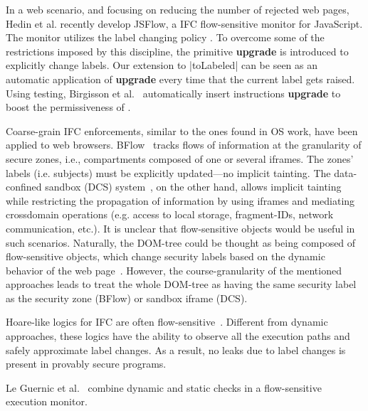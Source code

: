 In a web scenario, and focusing on reducing the number of rejected web pages,
Hedin et al. \citep{Hedin13} recently develop JSFlow, a IFC flow-sensitive
monitor for JavaScript. The monitor utilizes the label changing policy
{\nsu}. To overcome some of the restrictions imposed by this discipline, the
primitive \textbf{upgrade} is introduced to explicitly change labels. Our
extension to |toLabeled| can be seen as an automatic application of
\textbf{upgrade} every time that the current label gets raised. Using testing,
Birgisson et al.~\citep{Arnar2012} automatically insert instructions
\textbf{upgrade} to boost the permissiveness of {\nsu}. 



Coarse-grain IFC enforcements, similar to the ones found in OS work, have been
applied to web browsers. BFlow~\citep{Yip:2009} tracks flows of information at
the granularity of secure zones, i.e., compartments composed of one or several
iframes. The zones' labels (i.e. subjects) must be explicitly updated---no
implicit tainting. The data-confined sandbox (DCS)
system~\citep{conf/esorics/AkhaweLHSS13}, on the other hand, allows implicit
tainting while restricting the propagation of information by using iframes and
mediating crossdomain operations (e.g. access to local storage, fragment-IDs,
network communication, etc.). It is unclear that flow-sensitive objects would be
useful in such scenarios. Naturally, the DOM-tree could be thought as being
composed of flow-sensitive objects, which change security labels based on the
dynamic behavior of the web page~\citep{Russo:2009}. However, the
course-granularity of the mentioned approaches leads to treat the whole DOM-tree
as having the same security label as the security zone (BFlow) or sandbox iframe
(DCS). 

Hoare-like logics for IFC are often
flow-sensitive~\citep[e.g.][]{Amtoft:2006,Nanevski:2011}. Different from dynamic
approaches, these logics have the ability to observe all the execution paths and
safely approximate label changes. As a result, no leaks due to label changes is
present in provably secure programs.


Le Guernic et al.~\citep{LeGuernic:2006,Guernic:2007:ACM} combine dynamic and
static checks in a flow-sensitive execution monitor.
 



